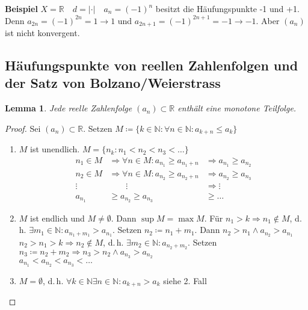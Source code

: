 \documentclass[ngerman,titlepage,twoside, parskip=half*]{scrreprt}
\newcommand*{\N}{\mathbb{N}}
\newcommand*{\R}{\mathbb{R}}
\theoremstyle{plain}
\newtheorem{lemma}{Lemma}
\theoremstyle{definition}
\theoremstyle{remark}
\begin{document}
\textbf{Beispiel} $X=\R \quad d=|\cdot| \quad a_n=(-1)^n$ besitzt die Häufungspunkte -1 und +1. Denn $a_{2n}=(-1)^{2n}
=1\rightarrow 1$ und $a_{2n+1}=(-1)^{2n+1}=-1\rightarrow -1$. Aber $(a_n)$ ist nicht konvergent.

\subsection[Häufungspunkte von reellen Zahlenfolgen\texorpdfstring{\\}{} und der Satz von Bolzano/Weierstrass]{Häufungspunkte von reellen Zahlenfolgen und der Satz von Bolzano/Weierstrass}
\begin{lemma}
\label{lemma:bw}
Jede reelle Zahlenfolge $(a_n) \subset \R$ enthält eine monotone Teilfolge.
\end{lemma}
\begin{proof}
  Sei $(a_n) \subset \R$. Setzen $M\coloneqq\{k \in \N \colon \forall n \in \N
  \colon a_{k+n}\leq a_k\}$
  \begin{enumerate}[1. F{a}ll]
  \item $M$ ist unendlich. $M=\{n_k\colon n_1<n_2<n_3<\ldots\}$
    \begin{align*}
      n_1 \in M & \Rightarrow \forall n \in M\colon a_{n_1}\geq a_{n_1+n} &
      \Rightarrow a_{n_1} \geq a_{n_2}\\
      n_2 \in M & \Rightarrow \forall n \in M\colon a_{n_2}\geq a_{n_2+n} &
      \Rightarrow a_{n_2} \geq a_{n_3}\\
      \vdots &\qquad \vdots & \Rightarrow \vdots\\
      a_{n_1} &\geq a_{n_2}\geq a_{n_3} &\geq \ldots
    \end{align*}
  \item $M$ ist endlich und $M \neq \emptyset$. Dann $\sup M = \max
    M$. Für $n_1>k \Rightarrow n_1 \notin M$, d.\,h.
    $\exists m_1 \in \N \colon a_{n_1+m_1}>a_{n_1}$. Setzen $n_2 \coloneqq n_1
    +m_1$. Dann $n_2>n_1 \wedge a_{n_2} > a_{n_1}$\\
    $n_2>n_1>k \Rightarrow n_2 \notin M$, d.\,h. $\exists m_2 \in \N \colon
    a_{n_2+m_2}$. Setzen $n_3\coloneqq n_2+m_2 \Rightarrow
    n_3>n_2 \wedge a_{n_3}>a_{n_2}$\\
    $a_{n_1}<a_{n_2}<a_{n_3}<\ldots$
  \item $M=\emptyset$, d.\,h. $\forall k \in \N \exists n \in \N \colon
    a_{k+n}>a_k$ siehe 2. Fall
\end{enumerate}
\end{proof}
\end{document}
